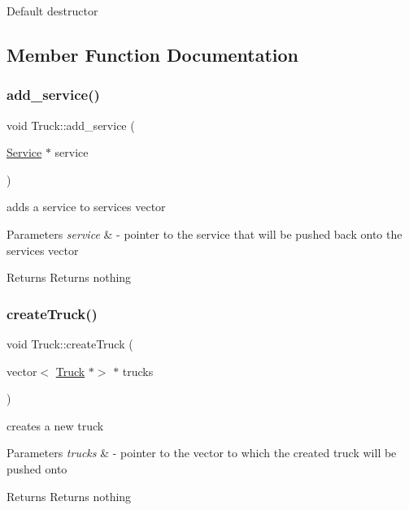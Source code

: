 Default destructor 

\subsection{Member Function Documentation}
\mbox{\label{class_truck_a03c8acd51c35f24db74cd8b2ee20cacb}} 
\subsubsection{\texorpdfstring{add\+\_\+service()}{add\_service()}}
{\footnotesize\ttfamily void Truck\+::add\+\_\+service (\begin{DoxyParamCaption}\item[{\hyperlink{class_service}{Service} $\ast$}]{service }\end{DoxyParamCaption})}



adds a service to services vector 


\begin{DoxyParams}{Parameters}
{\em service} & -\/ pointer to the service that will be pushed back onto the services vector \\
\hline
\end{DoxyParams}
\begin{DoxyReturn}{Returns}
Returns nothing 
\end{DoxyReturn}
\mbox{\label{class_truck_a4b2a202b4fe0bf70249493a9aa30f5dd}} 
\subsubsection{\texorpdfstring{create\+Truck()}{createTruck()}}
{\footnotesize\ttfamily void Truck\+::create\+Truck (\begin{DoxyParamCaption}\item[{vector$<$ \hyperlink{class_truck}{Truck} $\ast$$>$ $\ast$}]{trucks }\end{DoxyParamCaption})\hspace{0.3cm}{\ttfamily [static]}}



creates a new truck 


\begin{DoxyParams}{Parameters}
{\em trucks} & -\/ pointer to the vector to which the created truck will be pushed onto \\
\hline
\end{DoxyParams}
\begin{DoxyReturn}{Returns}
Returns nothing 
\end{DoxyReturn}
\mbox{\label{class_truck_a0eaa329bc72bf0171f7ec2a0a6240156}} 
